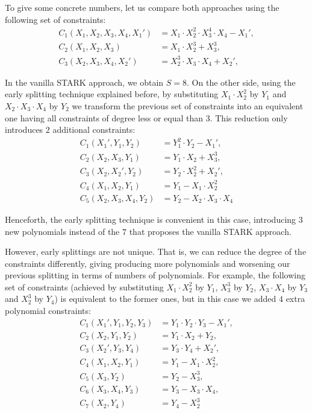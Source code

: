 \begin{example}
  To give some concrete numbers, let us compare both approaches using the following set of constraints:
  \begin{align*}
  C_1(X_1, X_2, X_3, X_4, X_1') &= X_1 \cdot X_2^2 \cdot X_3^4 \cdot X_4 - X_1', \\[0.2cm]
  C_2(X_1, X_2, X_3) &= X_1 \cdot X_2^3 + X_3^3 , \\[0.2cm]
  C_3(X_2, X_3, X_4, X_2') &= X_2^3 \cdot X_3 \cdot X_4 + X_2',
  \end{align*}
  
  In the vanilla STARK approach, we obtain $S = 8$.
  On the other side, using the early splitting technique explained before, by substituting $X_1 \cdot X_2^2$ by $Y_1$ and $X_2 \cdot X_3 \cdot X_4$ by $Y_2$ we transform the previous set of constraints into an equivalent one having all constraints of degree less or equal than $3$. This reduction only introduces $2$ additional constraints: 
  \begin{align*}
  C_1(X_1', Y_1, Y_2) &= Y_1^2 \cdot Y_2 - X_1', \\[0.2cm]
  C_2(X_2, X_3, Y_1) &= Y_1 \cdot X_2 + X_3^3, \\[0.2cm]
  C_3(X_2, X_2', Y_2) &= Y_2 \cdot X_2^2 + X_2', 	\\[0.2cm]
  C_4(X_1, X_2, Y_1) &= 	Y_1 - X_1 \cdot X_2^2\\[0.2cm]
  C_5(X_2, X_3, X_4, Y_2) &= Y_2 - X_2 \cdot X_3 \cdot X_4
  \end{align*}
  
  Henceforth, the early splitting technique is convenient in this case, introducing $3$ new polynomials instead of the $7$ that proposes the vanilla STARK approach. 
  
  However, early splittings are not unique. That is, we can reduce the degree of the constraints differently, giving producing more polynomials and worsening our previous splitting in terms of numbers of polynomials. For example, the following set of constraints (achieved by substituting $X_1 \cdot X_2^2$ by $Y_1$, $X_3^3$ by $Y_2$, $X_3 \cdot X_4$ by $Y_3$ and $X_2^3$ by $Y_4$) is equivalent to the former ones, but in this case we added $4$ extra polynomial constraints:
  \begin{align*}
  C_1(X_1', Y_1, Y_2, Y_3) &= Y_1 \cdot Y_2 \cdot Y_3 - X_1', \\[0.2cm]
  C_2(X_2, Y_1, Y_2) &= Y_1 \cdot X_2 + Y_2, \\[0.2cm]
  C_3(X_2', Y_3, Y_4) &= Y_3 \cdot Y_4 + X_2', \\[0.2cm]
  C_4(X_1, X_2, Y_1) &= Y_1 - X_1 \cdot X_2^2, \\[0.2cm]
  C_5(X_3, Y_2) &= Y_2 - X_3^3, \\[0.2cm]
  C_6(X_3, X_4, Y_3) &= Y_3 - X_3 \cdot X_4, \\[0.2cm]
  C_7(X_2,Y_4) &= Y_4 - X_2^3
  \end{align*}
  

\end{example}

